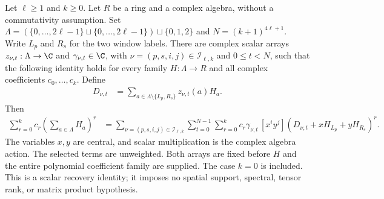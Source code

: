 \begin{lemma}
    \label{thm:global_two_window_polynomial_recovery}
    \leanok
    Let $\ell\ge1$ and $k\ge0$. Let $R$ be a ring and a complex algebra,
    without a commutativity assumption. Set
    $\Lambda=(\{0,\ldots,2\ell-1\}\sqcup\{0,\ldots,2\ell-1\})
        \sqcup\{0,1,2\}$ and $N=(k+1)^{4\ell+1}$.
    Write $L_p$ and $R_s$ for the two window labels.
    There are complex scalar arrays
    $z_{\nu,t}:\Lambda\to\C$ and $\gamma_{\nu,t}\in\C$, with
    $\nu=(p,s,i,j)\in\mathcal I_{\ell,k}$ and $0\le t<N$, such that the
    following identity holds for every family $H:\Lambda\to R$ and all
    complex coefficients $c_0,\ldots,c_k$. Define
    \begin{align}
        D_{\nu,t} & =\sum_{a\in\Lambda\setminus\{L_p,R_s\}}
        z_{\nu,t}(a)H_a.
        \label{eq:global_two_window_ordinary_sum}
    \end{align}
    Then
    \begin{align}
        \sum_{r=0}^{k} c_r\left(\sum_{a\in\Lambda}H_a\right)^r
         & =\sum_{\nu=(p,s,i,j)\in\mathcal I_{\ell,k}}
        \sum_{t=0}^{N-1}\sum_{r=0}^{k}
        c_r\gamma_{\nu,t}\,[x^iy^j]
        (D_{\nu,t}+xH_{L_p}+yH_{R_s})^r.
        \label{eq:global_two_window_recovery}
    \end{align}
    The variables $x,y$ are central, and scalar multiplication is the complex
    algebra action. The selected terms are unweighted. Both arrays are fixed
    before $H$ and the entire polynomial coefficient family are supplied.
    The case $k=0$ is included. This is a scalar recovery identity; it imposes
    no spatial support, spectral, tensor rank, or matrix product hypothesis.
\end{lemma}
